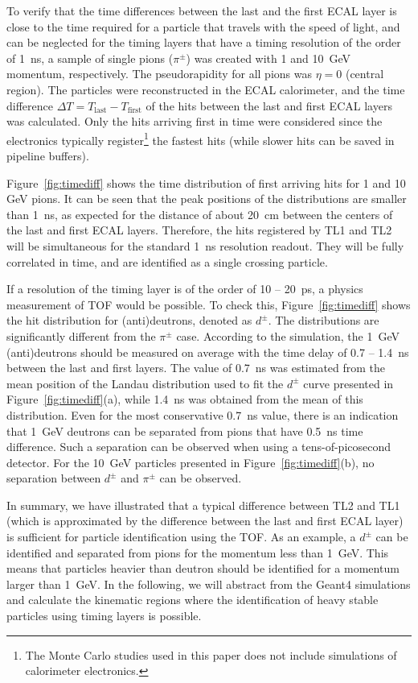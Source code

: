 \documentclass[final,1p,11pt]{elsarticle}
\begin{document}
To verify that the time differences between the last and the first ECAL layer is close to the time
required for a particle that travels with the speed of light, and can be neglected for the timing layers that
have a timing resolution of the order of 1~ns, a sample of single pions ($\pi^\pm$) was created with 1 and 10~GeV momentum, respectively. The
pseudorapidity for all pions was $\eta=0$ (central region). 
The particles were reconstructed in the ECAL calorimeter,
and the time difference $\Delta T= T_{\mathrm{last}}-T_{\mathrm{first}}$ of the hits between the last and first ECAL layers was calculated.
Only the hits arriving first in time were considered since the electronics typically register\footnote{The Monte Carlo studies used in this paper does not include
simulations of calorimeter electronics.} the fastest hits (while slower hits can be saved in pipeline buffers).

Figure~\ref{fig:timediff} shows the time distribution of first arriving hits 
for 1 and 10 GeV pions. It can be seen that the peak positions of the distributions are smaller
than 1~ns, as expected for the distance of about 20~cm between  the centers of the last and first ECAL layers.
Therefore, the hits registered by TL1 and TL2 will be simultaneous for the
standard 1~ns resolution readout. They will be fully correlated in time, and are identified as a single crossing particle.

If a resolution of the timing layer is of the order of 10 -- 20~ps, a physics measurement of TOF would be possible.
To check this, 
Figure~\ref{fig:timediff} shows the hit distribution for (anti)deutrons, denoted as $d^{\pm}$. 
The distributions are significantly different from the $\pi^{\pm}$ case. According to the simulation, the 1~GeV
(anti)deutrons should be measured on average with the time delay of 0.7 -- 1.4~ns between the last and first layers.
The value of 0.7~ns was estimated from the mean position of the Landau distribution used to fit the $d^{\pm}$ 
curve presented in Figure~\ref{fig:timediff}(a),
while 1.4~ns was obtained from the mean of this distribution. Even for the most conservative 0.7~ns value, there is an indication that 1~GeV
deutrons can be separated from pions that have 0.5~ns time difference. Such a separation can be observed when using a tens-of-picosecond detector.
For the 10~GeV particles presented in Figure~\ref{fig:timediff}(b), no separation between $d^{\pm}$ and $\pi^{\pm}$ can be observed.

In summary, we have illustrated that a typical difference between TL2 and TL1 (which is approximated by the difference
between the last and first ECAL layer) is sufficient for particle identification using the TOF.
As an example, a $d^{\pm}$ can be identified and separated from pions for the momentum less than 1~GeV.
This means that  particles heavier than deutron should be identified for a momentum larger than 1~GeV.
In the following, we will abstract from the Geant4 simulations and calculate the kinematic regions  where the identification of heavy stable 
particles using timing layers is possible.
 
\end{document}
